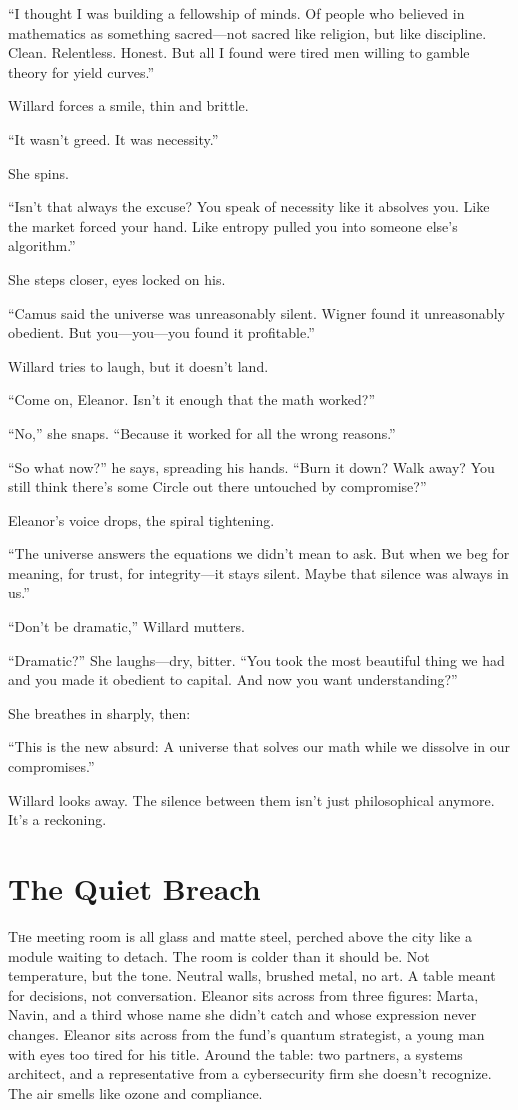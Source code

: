 “I thought I was building a fellowship of minds. Of people who believed in mathematics as something sacred—not sacred like religion, but like discipline. Clean. Relentless. Honest. But all I found were tired men willing to gamble theory for yield curves.”

Willard forces a smile, thin and brittle.

“It wasn’t greed. It was necessity.”

She spins.

“Isn’t that always the excuse? You speak of necessity like it absolves you. Like the market forced your hand. Like entropy pulled you into someone else's algorithm.”

She steps closer, eyes locked on his.

“Camus said the universe was unreasonably silent. Wigner found it unreasonably obedient.
But you—you—you found it profitable.”

Willard tries to laugh, but it doesn't land.

“Come on, Eleanor. Isn’t it enough that the math worked?”

“No,” she snaps. “Because it worked for all the wrong reasons.”

“So what now?” he says, spreading his hands. “Burn it down? Walk away? You still think there’s some Circle out there untouched by compromise?”

Eleanor’s voice drops, the spiral tightening.

“The universe answers the equations we didn’t mean to ask.
But when we beg for meaning, for trust, for integrity—it stays silent.
Maybe that silence was always in us.”

“Don’t be dramatic,” Willard mutters.

“Dramatic?” She laughs—dry, bitter. “You took the most beautiful thing we had and you made it obedient to capital. And now you want understanding?”

She breathes in sharply, then:

“This is the new absurd:
A universe that solves our math while we dissolve in our compromises.”

Willard looks away. The silence between them isn’t just philosophical anymore. It’s a reckoning.
\newpage
\section*{The Quiet Breach}
\lettrine{T}he meeting room is all glass and matte steel, perched above the city like a module waiting to detach. The room is colder than it should be. Not temperature, but the tone. Neutral walls, brushed metal, no art. A table meant for decisions, not conversation. Eleanor sits across from three figures: Marta, Navin, and a third whose name she didn’t catch and whose expression never changes. Eleanor sits across from the fund's quantum strategist, a young man with eyes too tired for his title. Around the table: two partners, a systems architect, and a representative from a cybersecurity firm she doesn’t recognize. The air smells like ozone and compliance.

